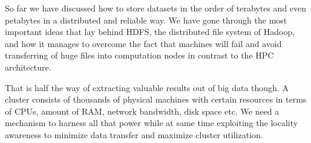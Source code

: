 So far we have discussed how to store datasets in the order of
terabytes and even petabytes in a distributed
and reliable way. We have gone through the most important ideas that
lay behind HDFS, the distributed file system of Hadoop, and how it
manages to overcome the fact that machines will fail and avoid
transferring of huge files into computation nodes in contrast to the HPC
architecture.

That is half the way of extracting valuable results out of big data
though. A cluster consists of thousands of physical machines with
certain resources in terms of CPUs, amount of RAM, network bandwidth,
disk space etc. We need a mechanism to harness all that power while at
same time exploiting the locality awareness to minimize data transfer
and maximize cluster utilization.
